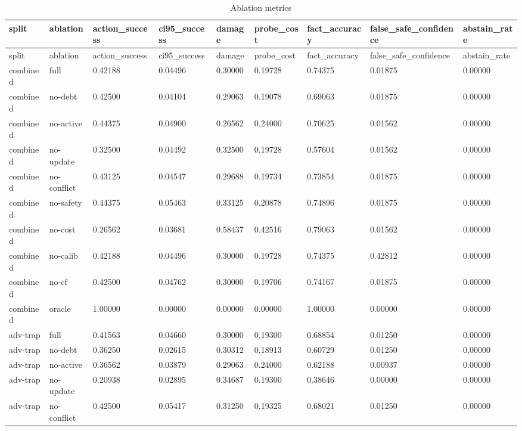 \documentclass{article}
\begin{document}
\begin{center}
\tiny
\renewcommand{\arraystretch}{0.92}
\setlength{\tabcolsep}{3pt}
\begin{longtable}{lllllllll}
\caption{Ablation metrics}\label{tab:ablation-full}\\
\toprule
split & ablation & action\_success & ci95\_success & damage & probe\_cost & fact\_accuracy & false\_safe\_confidence & abstain\_rate \\
\midrule
\endfirsthead
\toprule
split & ablation & action\_success & ci95\_success & damage & probe\_cost & fact\_accuracy & false\_safe\_confidence & abstain\_rate \\
\midrule
\endhead
combined & full & 0.42188 & 0.04496 & 0.30000 & 0.19728 & 0.74375 & 0.01875 & 0.00000 \\
combined & no-debt & 0.42500 & 0.04104 & 0.29063 & 0.19078 & 0.69063 & 0.01875 & 0.00000 \\
combined & no-active & 0.44375 & 0.04900 & 0.26562 & 0.24000 & 0.70625 & 0.01562 & 0.00000 \\
combined & no-update & 0.32500 & 0.04492 & 0.32500 & 0.19728 & 0.57604 & 0.01562 & 0.00000 \\
combined & no-conflict & 0.43125 & 0.04547 & 0.29688 & 0.19734 & 0.73854 & 0.01875 & 0.00000 \\
combined & no-safety & 0.44375 & 0.05463 & 0.33125 & 0.20878 & 0.74896 & 0.01875 & 0.00000 \\
combined & no-cost & 0.26562 & 0.03681 & 0.58437 & 0.42516 & 0.79063 & 0.01562 & 0.00000 \\
combined & no-calib & 0.42188 & 0.04496 & 0.30000 & 0.19728 & 0.74375 & 0.42812 & 0.00000 \\
combined & no-cf & 0.42500 & 0.04762 & 0.30000 & 0.19706 & 0.74167 & 0.01875 & 0.00000 \\
combined & oracle & 1.00000 & 0.00000 & 0.00000 & 0.00000 & 1.00000 & 0.00000 & 0.00000 \\
adv-trap & full & 0.41563 & 0.04660 & 0.30000 & 0.19300 & 0.68854 & 0.01250 & 0.00000 \\
adv-trap & no-debt & 0.36250 & 0.02615 & 0.30312 & 0.18913 & 0.60729 & 0.01250 & 0.00000 \\
adv-trap & no-active & 0.36562 & 0.03879 & 0.29063 & 0.24000 & 0.62188 & 0.00937 & 0.00000 \\
adv-trap & no-update & 0.20938 & 0.02895 & 0.34687 & 0.19300 & 0.38646 & 0.00000 & 0.00000 \\
adv-trap & no-conflict & 0.42500 & 0.05417 & 0.31250 & 0.19325 & 0.68021 & 0.01250 & 0.00000 \\

\end{longtable}
\end{center}
\end{document}
